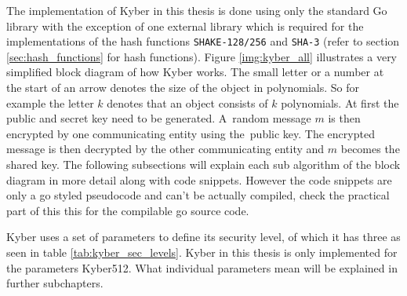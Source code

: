 The implementation of Kyber in this thesis is done using only the standard Go library with the exception of one external library \cite{00fV2cvg7Z6H2tS3} which is required for the implementations of the hash functions \texttt{SHAKE-128/256} and \texttt{SHA-3} (refer to section \ref{sec:hash_functions} for hash functions). Figure \ref{img:kyber_all} illustrates a very simplified block diagram of how Kyber works. The small letter or a number at the start of an arrow denotes the size of the object in polynomials. So for example the letter $k$ denotes that an object consists of $k$ polynomials. At first the public and secret key need to be generated. A~random message $m$ is then encrypted by one communicating entity using the~public key. The encrypted message is then decrypted by the other communicating entity and $m$ becomes the shared key. The following subsections will explain each sub algorithm of the block diagram in more detail along with code snippets. However the code snippets are only a go styled pseudocode and can't be actually compiled, check the practical part of this this for the compilable go source code.


Kyber uses a set of parameters to define its security level, of which it has three as seen in table \ref{tab:kyber_sec_levels}. Kyber in this thesis is only implemented for the parameters Kyber512. What individual parameters mean will be explained in further subchapters.


